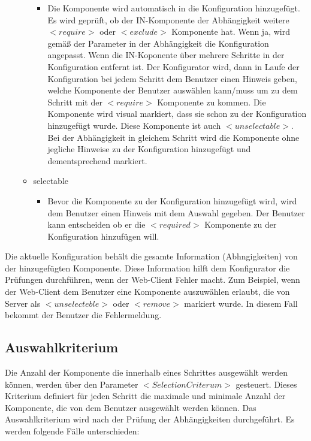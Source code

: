 \documentclass{article}
\begin{document}
\begin{itemize}
\begin{itemize}
\begin{itemize}
          \item Die Komponente wird automatisch in die Konfiguration hinzugefügt.
          Es wird geprüft, ob der IN-Komponente der Abhängigkeit weitere
          $<require>$ oder $<exclude>$ Komponente hat. Wenn ja, wird gemäß der
          Parameter in der Abhängigkeit die Konfiguration angepasst. Wenn die
          IN-Koponente über mehrere Schritte in der Konfiguration entfernt ist. Der
          Konfigurator wird, dann in Laufe der Konfiguration bei jedem Schritt dem
          Benutzer einen Hinweis geben, welche Komponente der Benutzer auswählen
          kann/muss um zu dem Schritt mit der $<require>$ Komponente zu kommen. Die
          Komponente wird visual markiert, dass sie schon zu der Konfiguration
          hinzugefügt wurde. Diese Komponente ist auch $<unselectable>$. Bei der
          Abhängigkeit in gleichem Schritt wird die Komponente ohne jegliche
          Hinweise zu der Konfiguration hinzugefügt und dementsprechend markiert.
        \end{itemize}
    
        \item selectable
    
        \begin{itemize}
            \item Bevor die Komponente zu der Konfiguration hinzugefügt wird, wird
            dem Benutzer einen Hinweis mit dem Auswahl gegeben. Der Benutzer kann
            entscheiden ob er die $<required>$ Komponente zu der Konfiguration
            hinzufügen will.
        \end{itemize}
    \end{itemize}
\end{itemize}

Die aktuelle Konfiguration behält die gesamte Information (Abhngigkeiten)
von der hinzugef\"ugten Komponente. Diese Information hilft dem Konfigurator die
Pr\"ufungen durchf\"uhren, wenn der Web-Client Fehler macht. Zum Beispiel, wenn
der Web-Client dem Benutzer eine Komponente auszuwählen erlaubt, die von
Server als $<unselecteble>$ oder $<remove>$ markiert wurde. In diesem Fall
bekommt der Benutzer die Fehlermeldung.

\subsection{Auswahlkriterium}

Die Anzahl der Komponente die innerhalb eines Schrittes ausgewählt werden
können, werden über den Parameter $<SelectionCriterum>$ gesteuert. Dieses
Kriterium definiert für jeden Schritt die maximale und minimale Anzahl der
Komponente, die von dem Benutzer ausgewählt werden können. Das Auswahlkriterium 
wird nach der Prüfung der Abhängigkeiten durchgeführt. Es werden folgende Fälle
unterschieden:
\end{document}
